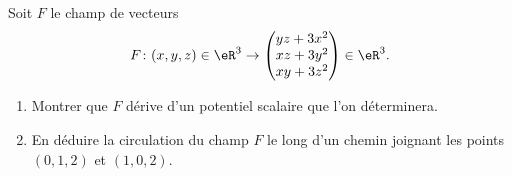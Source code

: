 
\begin{exercice}\label{exoOutilsMath-0127}

    Soit \( F\) le champ de vecteurs
    \begin{equation}
        F\colon (x,y,z)\in\eR^3\to \begin{pmatrix}
            yz+3x^2    \\ 
            xz+3y^2    \\ 
            xy+3z^2
        \end{pmatrix}\in\eR^3.
    \end{equation}
    \begin{enumerate}
        \item
            Montrer que \( F\) dérive d'un potentiel scalaire que l'on déterminera.
        \item
            En déduire la circulation du champ \( F\) le long d'un chemin joignant les points \( (0,1,2)\) et \( (1,0,2)\).
    \end{enumerate}

\end{exercice}
